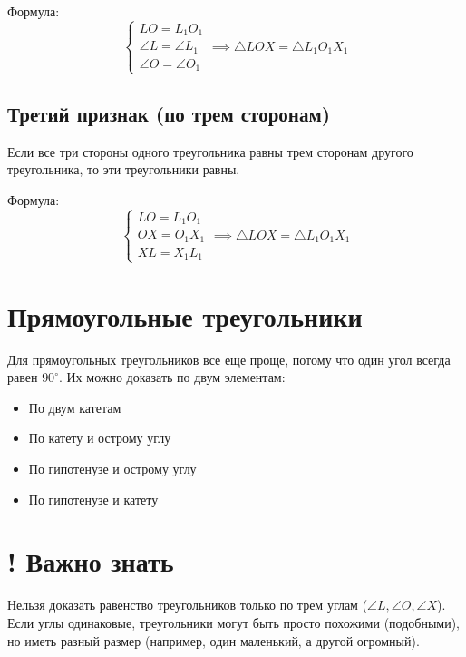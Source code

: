 \documentclass[12pt]{article}
\begin{document}
Формула:
\[
\begin{cases}
LO = L_1O_1 \\
\angle L = \angle L_1 \\
\angle O = \angle O_1
\end{cases}
\implies \triangle LOX = \triangle L_1O_1X_1
\]

\subsection{Третий признак (по трем сторонам)}
Если все три стороны одного треугольника равны трем сторонам другого треугольника, то эти треугольники равны.

Формула:
\[
\begin{cases}
LO = L_1O_1 \\
OX = O_1X_1 \\
XL = X_1L_1
\end{cases}
\implies \triangle LOX = \triangle L_1O_1X_1
\]

\section{Прямоугольные треугольники}
Для прямоугольных треугольников все еще проще, потому что один угол всегда равен $90^\circ$. Их можно доказать по двум элементам:
\begin{itemize}
    \item По двум катетам
    \item По катету и острому углу
    \item По гипотенузе и острому углу
    \item По гипотенузе и катету
\end{itemize}

\section*{! Важно знать}
Нельзя доказать равенство треугольников только по трем углам ($\angle L, \angle O, \angle X$). Если углы одинаковые, треугольники могут быть просто похожими (подобными), но иметь разный размер (например, один маленький, а другой огромный).
\end{document}
